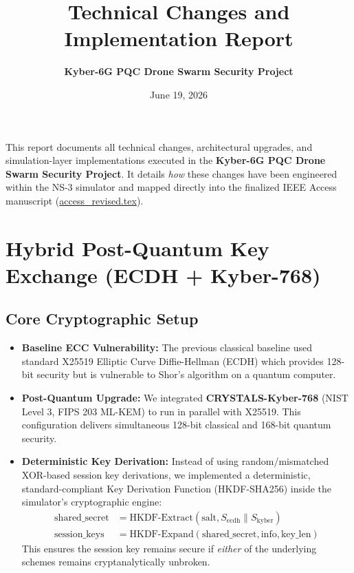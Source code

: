 \documentclass[11pt,a4paper]{article}
\title{\textbf{Technical Changes and Implementation Report}}
\author{\textbf{Kyber-6G PQC Drone Swarm Security Project}}
\date{June 19, 2026}
\begin{document}
\maketitle
\thispagestyle{fancy}

This report documents all technical changes, architectural upgrades, and simulation-layer implementations executed in the \textbf{Kyber-6G PQC Drone Swarm Security Project}. It details \textit{how} these changes have been engineered within the NS-3 simulator and mapped directly into the finalized IEEE Access manuscript (\href{file:///c:/wsl.localhost/Ubuntu-22.04/home/abishek14/Kyber-6G project/IEEE_Access_LaTeX_template__1_dup/access_revised.tex}{access\_revised.tex}).

\hrulefill

\section{Hybrid Post-Quantum Key Exchange (ECDH + Kyber-768)}

\subsection{Core Cryptographic Setup}
\begin{itemize}
    \item \textbf{Baseline ECC Vulnerability:} The previous classical baseline used standard X25519 Elliptic Curve Diffie-Hellman (ECDH) which provides 128-bit security but is vulnerable to Shor's algorithm on a quantum computer.
    \item \textbf{Post-Quantum Upgrade:} We integrated \textbf{CRYSTALS-Kyber-768} (NIST Level 3, FIPS 203 ML-KEM) to run in parallel with X25519. This configuration delivers simultaneous 128-bit classical and 168-bit quantum security.
    \item \textbf{Deterministic Key Derivation:} Instead of using random/mismatched XOR-based session key derivations, we implemented a deterministic, standard-compliant Key Derivation Function (HKDF-SHA256) inside the simulator's cryptographic engine:
    \begin{align*}
        \text{shared\_secret} &= \text{HKDF-Extract}(\text{salt}, S_{\text{ecdh}} \parallel S_{\text{kyber}}) \\
        \text{session\_keys} &= \text{HKDF-Expand}(\text{shared\_secret}, \text{info}, \text{key\_len})
    \end{align*}
    This ensures the session key remains secure if \textit{either} of the underlying schemes remains cryptanalytically unbroken.
\end{itemize}
\end{document}
